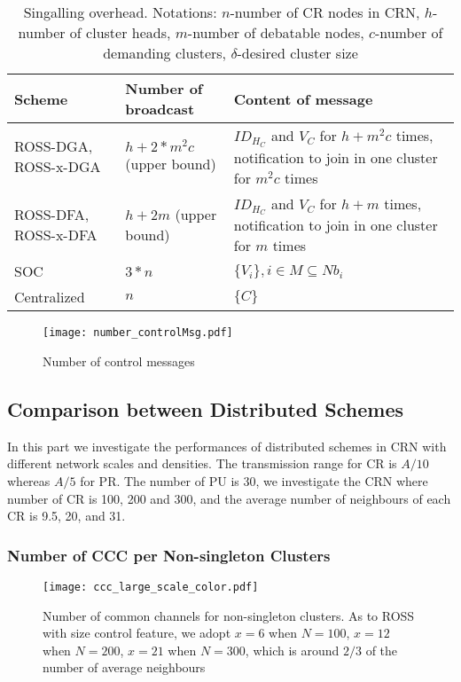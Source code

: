 \begin{table}[hc]
\center
\begin{tabular}{|p{3 cm}|p{3 cm}|p{7.5 cm}|}
\hline
 Scheme 		&   Number of broadcast  	& Content of message \\ \hline
 ROSS-DGA, ROSS-x-DGA 		&   $h+2*m^2c$  (upper bound)				& $ID_{H_C}$ and $V_C$ for $h+m^2c$ times, notification to join in one cluster for $m^2c$ times					\\ \hline
 ROSS-DFA, ROSS-x-DFA 		&   $h+ 2m$	 (upper bound)				& $ID_{H_C}$ and $V_C$ for $h+m$ times, notification to join in one cluster for $m$ times	 					\\ \hline
 SOC 			&   $3*n$					& $\{V_i\}, i\in M\subseteq Nb_i$						\\ \hline
 Centralized	&	$n$						& $\{C\}$         	\\ \hline
\end{tabular}
\caption{Singalling overhead. Notations: $n$-number of CR nodes in CRN, $h$-number of cluster heads, $m$-number of debatable nodes, $c$-number of demanding clusters, $\delta$-desired cluster size}
\label{tab_overhead}
\end{table}


\begin{figure}[ht!]
  \centering
  \texttt{[image: number\_controlMsg.pdf]}
  \caption{Number of control messages}
  \label{control_msg}
\end{figure}


\subsection{Comparison between Distributed Schemes}
In this part we investigate the performances of distributed schemes in CRN with different network scales and densities.
The transmission range for CR is $A/10$ whereas $A/5$ for PR.
The number of PU is 30, we investigate the CRN where number of CR is 100, 200 and 300, and the average number of neighbours of each CR is 9.5, 20, and 31.


\subsubsection*{Number of CCC per Non-singleton Clusters}

\begin{figure}[ht!]
  \centering
  \texttt{[image: ccc\_large\_scale\_color.pdf]}
  \caption{Number of common channels for non-singleton clusters. As to ROSS with size control feature, we adopt $x=6$ when $N=100$, $x=12$ when $N=200$, $x=21$ when $N=300$, which is around $2/3$ of the number of average neighbours}
  \label{ccc_large_scale}
\end{figure}

